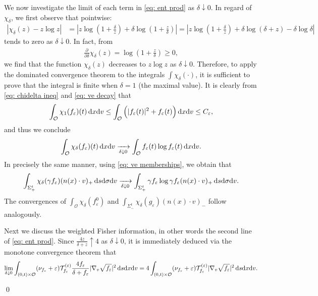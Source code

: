 \documentclass[10pt, reqno]{amsart}
\theoremstyle{plain}
\theoremstyle{definition}
\theoremstyle{remark}
\renewenvironment{proof}[1][\proofname]{\noindent{\scshape #1.\quad}}{\qed}
\numberwithin{equation}{section}
\newcommand{\calO}{\mathcal O}
\newcommand{\calT}{\mathcal T}
\newcommand{\p}{\partial}
\newcommand{\ve}{\varepsilon}
\newcommand{\dx}{\textnormal{d}x}
\newcommand{\dv}{\textnormal{d}v}
\newcommand{\ds}{\textnormal{d}s}
\newcommand{\tnd}{\textnormal{d}}
\newcommand{\lt}{\left}
\newcommand{\rt}{\right}
\begin{document}
\begin{proof}
\begin{equation}
    \end{equation}
    We now investigate the limit of each term in \eqref{eq: ent prod} as $\delta\downarrow 0$. In regard of $\chi_\delta$, we first observe that pointwise:
\begin{equation*}
\begin{split}
    |\chi_\delta(z) - z \log z| &= \lt| z \log \lt(1 + \frac{\delta}{z}\rt) + \delta \log \lt(1+\frac{z}{\delta}\rt) \rt|  = \lt|z \log \lt(1 + \frac{\delta}{z}\rt) + \delta \log (\delta + z) - \delta \log \delta \rt| 
    \end{split}
\end{equation*}
tends to zero as $\delta\downarrow 0$. In fact, from
\begin{align*}
    \frac{\p}{\p \delta} \chi_\delta(z) = \log \lt(1 + \frac{z}{\delta}\rt) \ge 0,
\end{align*}
we find that the function $\chi_\delta(z)$ decreases to $z\log z$ as $\delta\downarrow 0$. Therefore, to apply the dominated convergence theorem to the integrals $\int \chi_\delta(\cdot)$, it is sufficient to prove that the integral is finite when $\delta=1$ (the maximal value). It is clearly from \eqref{eq: chidelta ineq} and \eqref{eq: ve decay} that
\begin{align*}
    \int_{\calO} \chi_1(f_\ve)(t) \,\dx\dv \le \int_{\calO} \Big( |f_\ve(t)|^2 + f_\ve(t) \Big) \,\dx\dv \le C_\ve,
\end{align*}
and thus we conclude
\begin{align*}
    \int_{\calO} \chi_\delta(f_\ve)(t) \,\dx\dv \xrightarrow[\delta\downarrow 0]{} \int_{\calO} f_\ve(t) \log f_\ve(t) \,\dx\dv.
\end{align*}
In precisely the same manner, using \eqref{eq: ve memberships}, we obtain that
\begin{align*}
    \int_{\Sigma_+^t} \chi_\delta(\gamma f_\ve) (n(x)\cdot v)_+ \,\ds\tnd\sigma\dv \xrightarrow[\delta\downarrow 0]{} \int_{\Sigma_+^t} \gamma f_\ve \log \gamma f_\ve (n(x)\cdot v)_+ \,\ds\tnd\sigma\dv.
\end{align*}
The convergences of $\int_{\calO} \chi_\delta(f_\ve^0)$ and $\int_{\Sigma_-^t} \chi_\delta(g_\ve)(n(x)\cdot v)_-$ follow analogously.

Next we discuss the weighted Fisher information, in other words the second line of \eqref{eq: ent prod}. Since $\frac{4z}{\delta + z} \uparrow 4$ as $\delta\downarrow 0$, it is immediately deduced via the monotone convergence theorem that
    \begin{align*}
         \lim_{\delta\downarrow 0} \int_{(0,t)\times \calO} (\nu_{f_\ve} + \ve) \calT_{f_\ve}^{(\ve)} \frac{4f_\ve}{\delta+f_\ve} |\nabla_v \sqrt{f_\ve}|^2 \,\ds\dx\dv  = 4\int_{(0,t)\times \calO} (\nu_{f_\ve} + \ve) \calT_{f_\ve}^{(\ve)} |\nabla_v \sqrt{f_\ve}|^2 \,\ds\dx\dv.
    \end{align*}


\end{proof}
\end{document}
